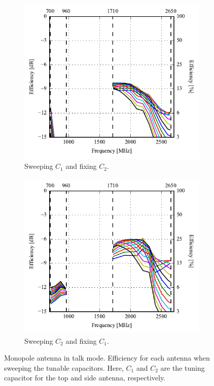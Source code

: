 \begin{figure}[htbp]
    \centering
    \begin{subfigure}{0.49\linewidth}
        \includegraphics{img/tech_sol/monopole/talk_mode/efficiency-ac1-csh1}
        \caption{Sweeping $C_1$ and fixing $C_2$.}
    \end{subfigure}
    \hfill
    \begin{subfigure}{0.49\linewidth}
        \includegraphics{img/tech_sol/monopole/talk_mode/efficiency-ac2-csh2}
        \caption{Sweeping $C_2$ and fixing $C_1$.}
    \end{subfigure}
    \caption{Monopole antenna in talk mode. Efficiency for each antenna when sweeping the tunable capacitors. Here, $C_1$ and $C_2$ are the tuning capacitor for the top and side antenna, respectively.}
    \label{fig:eff_sol1_talk}
\end{figure}

